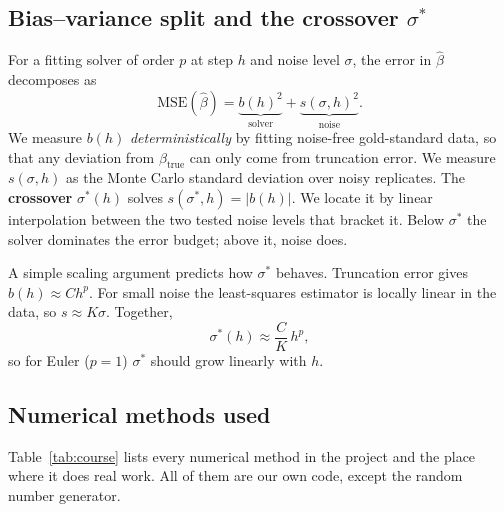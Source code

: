 \documentclass[sigconf]{acmart}
\begin{document}
\subsection{Bias--variance split and the crossover \texorpdfstring{$\sigma^*$}{sigma*}}
\label{sec:crossover}
For a fitting solver of order $p$ at step $h$ and noise level $\sigma$,
the error in $\hat\beta$ decomposes as
\begin{equation}
  \mathrm{MSE}(\hat\beta)=\underbrace{b(h)^2}_{\text{solver}}
  +\underbrace{s(\sigma,h)^2}_{\text{noise}} .
  \label{eq:mse}
\end{equation}
We measure $b(h)$ \emph{deterministically} by fitting noise-free
gold-standard data, so that any deviation from $\beta_{\mathrm{true}}$
can only come from truncation error. We measure $s(\sigma,h)$ as the
Monte Carlo standard deviation over noisy replicates. The
\textbf{crossover} $\sigma^*(h)$ solves $s(\sigma^*,h)=|b(h)|$. We locate
it by linear interpolation between the two tested noise levels that
bracket it. Below $\sigma^*$ the solver dominates the error budget;
above it, noise does.

A simple scaling argument predicts how $\sigma^*$ behaves. Truncation
error gives $b(h)\approx Ch^p$. For small noise the least-squares
estimator is locally linear in the data, so $s\approx K\sigma$. Together,
\begin{equation}
  \sigma^*(h)\approx\frac{C}{K}\,h^{p},
  \label{eq:sigmastar}
\end{equation}
so for Euler ($p=1$) $\sigma^*$ should grow linearly with $h$.

\subsection{Numerical methods used}
\label{sec:course}
Table~\ref{tab:course} lists every numerical method in the project and
the place where it does real work. All of them are our own code, except
the random number generator.
\end{document}
